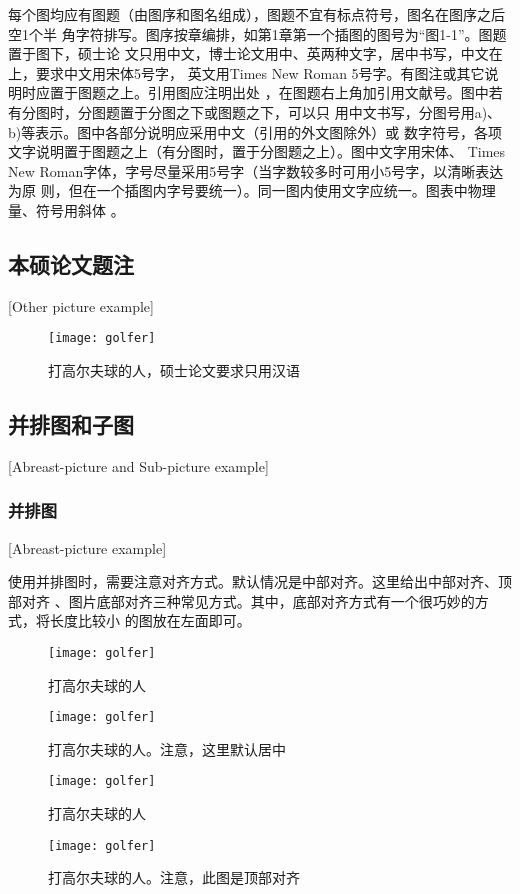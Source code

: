 每个图均应有图题（由图序和图名组成），图题不宜有标点符号，图名在图序之后空1个半
角字符排写。图序按章编排，如第1章第一个插图的图号为“图1-1”。图题置于图下，硕士论
文只用中文，博士论文用中、英两种文字，居中书写，中文在上，要求中文用宋体5号字，
英文用Times New Roman 5号字。有图注或其它说明时应置于图题之上。引用图应注明出处
，在图题右上角加引用文献号。图中若有分图时，分图题置于分图之下或图题之下，可以只
用中文书写，分图号用a)、b)等表示。图中各部分说明应采用中文（引用的外文图除外）或
数字符号，各项文字说明置于图题之上（有分图时，置于分图题之上）。图中文字用宋体、
Times New Roman字体，字号尽量采用5号字（当字数较多时可用小5号字，以清晰表达为原
则，但在一个插图内字号要统一）。同一图内使用文字应统一。图表中物理量、符号用斜体
。
\subsection{本硕论文题注}[Other picture example]
\begin{figure}[h]
	\centering
	\texttt{[image: golfer]}
	\caption{打高尔夫球的人，硕士论文要求只用汉语}
\end{figure}

\subsection{并排图和子图}[Abreast-picture and Sub-picture example]
\subsubsection{并排图}[Abreast-picture example]

使用并排图时，需要注意对齐方式。默认情况是中部对齐。这里给出中部对齐、顶部对齐
、图片底部对齐三种常见方式。其中，底部对齐方式有一个很巧妙的方式，将长度比较小
的图放在左面即可。

\begin{figure}[htbp]
	\centering
	\begin{minipage}{0.4\textwidth}
		\centering
		\texttt{[image: golfer]}
		\caption{打高尔夫球的人}
	\end{minipage}
	\centering
	\begin{minipage}{0.4\textwidth}
		\centering
		\texttt{[image: golfer]}
		\caption{打高尔夫球的人。注意，这里默认居中}
	\end{minipage}
\end{figure}

\begin{figure}[htbp]
	\centering
	\begin{minipage}[t]{0.4\textwidth}
		\centering
		\texttt{[image: golfer]}
		\caption{打高尔夫球的人}
	\end{minipage}
	\centering
	\begin{minipage}[t]{0.4\textwidth}
		\centering
		\texttt{[image: golfer]}
		\caption{打高尔夫球的人。注意，此图是顶部对齐}
	\end{minipage}
\end{figure}

